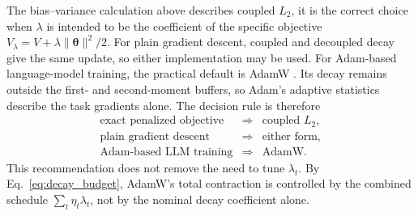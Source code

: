 \documentclass[11pt,letterpaper]{article}
\newcommand{\thet}{\bm{\theta}}
\begin{document}
The bias--variance calculation above describes coupled \(L_2\), it is the
correct choice when \(\lambda\) is intended to be the coefficient of the
specific objective
\(V_\lambda=V+\lambda\lVert\thet\rVert^2/2\). For plain gradient descent,
coupled and decoupled decay give the same update, so either implementation may
be used. For Adam-based language-model training, the practical default is
AdamW \cite{loshchilov2019adamw}. Its decay remains outside the first- and
second-moment buffers, so Adam's adaptive statistics describe the task
gradients alone. The decision rule is therefore
\begin{equation}
  \boxed{
  \begin{array}{rcl}
    \text{exact penalized objective} &\Longrightarrow& \text{coupled }L_2,\\
    \text{plain gradient descent}    &\Longrightarrow& \text{either form},\\
    \text{Adam-based LLM training}   &\Longrightarrow& \text{AdamW}.
  \end{array}}
\end{equation}
This recommendation does not remove the need to tune \(\lambda_t\). By
Eq.~\eqref{eq:decay_budget}, AdamW's total contraction is controlled by the
combined schedule \(\sum_t\eta_t\lambda_t\), not by the nominal decay
coefficient alone.
\end{document}
